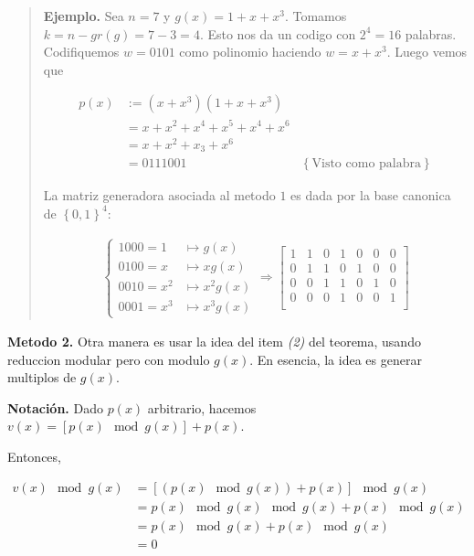 \documentclass[a4paper]{article}
\begin{document}
\small
\begin{quote}

\textbf{Ejemplo.} Sea $n = 7$ y $g(x) = 1 + x + x^3$. Tomamos $k = n - gr(g) = 7 - 3 = 4$.
Esto nos da un codigo con $2^4 = 16$ palabras. Codifiquemos $w = 0101$
como polinomio haciendo $w = x  + x^3$. Luego vemos que 

\begin{align*}
    p(x) &:= (x+x^3)(1 + x + x^3)  \\ 
         &= x + x^2 + x^4 + x^5 + x^4 + x^6 \\ 
         &= x + x^2 + x_3 + x^6 \\ 
         &= 0111001 & \left\{ \text{Visto como palabra} \right\} 
\end{align*}

La matriz generadora asociada al metodo $1$ es dada por la base canonica de $\left\{ 0, 1 \right\}^4 $:

\begin{align*}
    \begin{cases}
        1000 = 1 & \mapsto g(x)\\ 
        0100 = x &\mapsto xg(x) \\ 
        0010 = x^2&\mapsto x^2g(x)  \\ 
        0001 = x^3&\mapsto x^3g(x)
    \end{cases} \Rightarrow \begin{bmatrix} 
        1 & 1 & 0 & 1 & 0 & 0 & 0 \\ 
        0 & 1 & 1 & 0 & 1 & 0 & 0 \\ 
        0 & 0 & 1 & 1 & 0 & 1 & 0 \\ 
        0 & 0 & 0 & 1 & 0 & 0 & 1 \\ 
    \end{bmatrix} 
\end{align*}

\end{quote}
\normalsize

\textbf{Metodo 2.} Otra manera es usar la idea del item \textit{(2)} del teorema,
usando reduccion modular pero con modulo $g(x)$. En esencia, la 
idea es generar multiplos de $g(x)$.

\textbf{Notación.} Dado $p(x)$ arbitrario, hacemos $v(x) = \left[ p(x) \mod g(x) \right] + p(x)$.

Entonces, 

\begin{align*}
    v(x) \mod g(x) &= \left[ \left( p(x) \mod g(x) \right) + p(x)  \right]  \mod g(x) \\ 
                   &= p(x) \mod g(x) \mod g(x) + p(x) \mod g(x) \\ 
                   &= p(x) \mod g(x) + p(x) \mod g(x) \\ 
                   &= 0
\end{align*}
\end{document}
